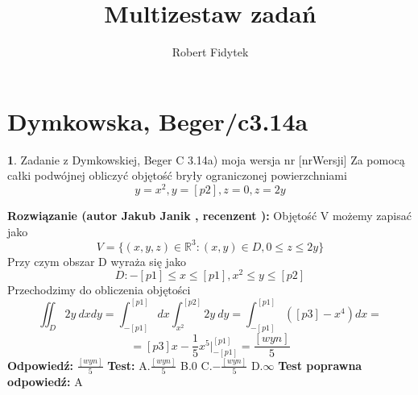 \documentclass[12pt, a4paper]{article}
\title{Multizestaw zadań}
\author{Robert Fidytek}
\date{}
\theoremstyle{definition} %
\newtheorem{zad}{}
\newcommand{\kategoria}[1]{\section{#1}} %
\newcommand{\zadStart}[1]{\begin{zad}#1\newline} %
\newcommand{\zadStop}{\end{zad}}   %
\newcommand{\rozwStart}[2]{\noindent \textbf{Rozwiązanie (autor #1 , recenzent #2): }\newline} %
\newcommand{\rozwStop}{\newline}                                            %
\newcommand{\odpStart}{\noindent \textbf{Odpowiedź:}\newline}    %
\newcommand{\odpStop}{\newline}                                             %
\newcommand{\testStart}{\noindent \textbf{Test:}\newline} %
\newcommand{\testStop}{\newline} %
\newcommand{\kluczStart}{\noindent \textbf{Test poprawna odpowiedź:}\newline} %
\newcommand{\kluczStop}{\newline} %
\begin{document}
\maketitle


\kategoria{Dymkowska, Beger/c3.14a}
\zadStart{Zadanie z Dymkowskiej, Beger C 3.14a) moja wersja nr [nrWersji]}
Za pomocą całki podwójnej obliczyć objętość bryły ograniczonej powierzchniami $$y=x^2, y=[p2], z=0, z=2y$$
\zadStop
\rozwStart{Jakub Janik}{}
Objętość V możemy zapisać jako
$$V=\{(x,y,z)\in\mathbb{R}^3\colon(x,y)\in D, 0 \leq z \leq 2y\}$$
Przy czym obszar D wyraża się jako
$$D\colon-[p1]\leq x \leq [p1], x^2 \leq y \leq [p2]$$
Przechodzimy do obliczenia objętości
$$\iint_D 2y\ dxdy=\int_{-[p1]}^{[p1]}dx\int_{x^2}^{[p2]}2y\ dy=\int_{-[p1]}^{[p1]}([p3]-x^4)dx=$$
$$=[p3]x-\frac{1}{5}x^5\Big|_{-[p1]}^{[p1]}=\frac{[wyn]}{5}$$
\rozwStop
\odpStart
$\frac{[wyn]}{5}$
\odpStop
\testStart
A.$\frac{[wyn]}{5}$
B.$0$
C.$-\frac{[wyn]}{5}$
D.$\infty$
\testStop
\kluczStart
A
\kluczStop
\end{document}
